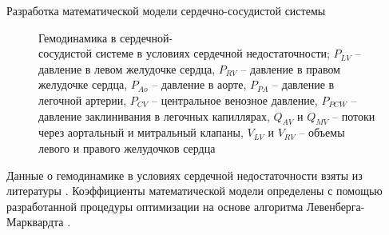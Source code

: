 \documentclass[a4paper, 9pt]{beamer}
\begin{document}
\begin{frame}{Разработка математической модели сердечно-сосудистой системы}
\begin{minipage}[ht]{0.51\textwidth}
\vskip5pt
\begin{figure}
\caption{\scriptsize Гемодинамика в сердечной-\\сосудистой системе в условиях сердечной недостаточности; \tiny $P_{LV}$ -- давление в левом желудочке сердца, $P_{RV}$ -- давление в правом желудочке сердца, $P_{Ao}$ -- давление в аорте, $P_{PA}$ -- давление в легочной артерии, $P_{CV}$ -- центральное венозное давление, $P_{PCW}$ -- давление заклинивания в легочных капиллярах, $Q_{AV}$ и $Q_{MV}$ -- потоки через аортальный и митральный клапаны, $V_{LV}$ и $V_{RV}$ -- объемы левого и правого желудочков сердца}
\end{figure}

\end{minipage}
\vskip-2pt
\scriptsize Данные о гемодинамике в условиях сердечной недостаточности взяты из литературы \footnotemark[1]. Коэффициенты математической модели определены с помощью разработанной процедуры оптимизации на основе алгоритма Левенберга-Марквардта \footnotemark[2]. 

\vskip6pt




\end{frame}
\end{document}
